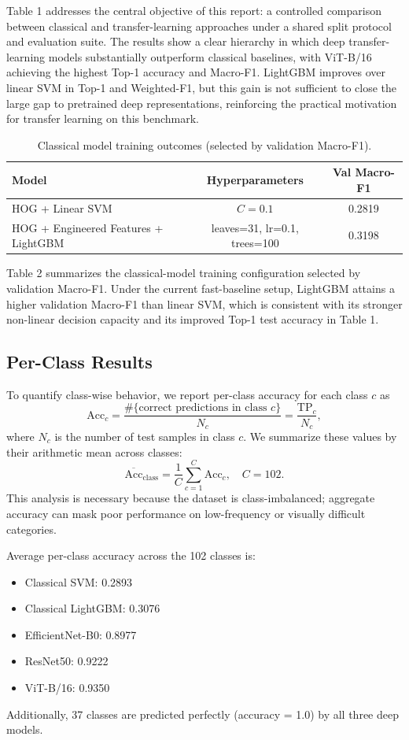 \documentclass[11pt]{article}
\begin{document}
Table 1 addresses the central objective of this report: a controlled comparison between classical and transfer-learning approaches under a shared split protocol and evaluation suite. The results show a clear hierarchy in which deep transfer-learning models substantially outperform classical baselines, with ViT-B/16 achieving the highest Top-1 accuracy and Macro-F1. LightGBM improves over linear SVM in Top-1 and Weighted-F1, but this gain is not sufficient to close the large gap to pretrained deep representations, reinforcing the practical motivation for transfer learning on this benchmark.

\begin{table}[H]
\centering
\caption{Classical model training outcomes (selected by validation Macro-F1).}
\begin{tabular}{lcc}
\toprule
Model & Hyperparameters & Val Macro-F1 \\
\midrule
HOG + Linear SVM & $C=0.1$ & 0.2819 \\
HOG + Engineered Features + LightGBM & leaves=31, lr=0.1, trees=100 & 0.3198 \\
\bottomrule
\end{tabular}
\end{table}

Table 2 summarizes the classical-model training configuration selected by validation Macro-F1. Under the current fast-baseline setup, LightGBM attains a higher validation Macro-F1 than linear SVM, which is consistent with its stronger non-linear decision capacity and its improved Top-1 test accuracy in Table 1.

\subsection{Per-Class Results}
To quantify class-wise behavior, we report per-class accuracy for each class $c$ as
\[
\mathrm{Acc}_c = \frac{\#\{\text{correct predictions in class } c\}}{N_c} = \frac{\mathrm{TP}_c}{N_c},
\]
where $N_c$ is the number of test samples in class $c$. We summarize these values by their arithmetic mean across classes:
\[
\overline{\mathrm{Acc}}_{\mathrm{class}} = \frac{1}{C}\sum_{c=1}^{C}\mathrm{Acc}_c,\quad C=102.
\]
This analysis is necessary because the dataset is class-imbalanced; aggregate accuracy can mask poor performance on low-frequency or visually difficult categories.

Average per-class accuracy across the 102 classes is:
\begin{itemize}
    \item Classical SVM: 0.2893
    \item Classical LightGBM: 0.3076
    \item EfficientNet-B0: 0.8977
    \item ResNet50: 0.9222
    \item ViT-B/16: 0.9350
\end{itemize}
Additionally, 37 classes are predicted perfectly (accuracy = 1.0) by all three deep models.
\end{document}
